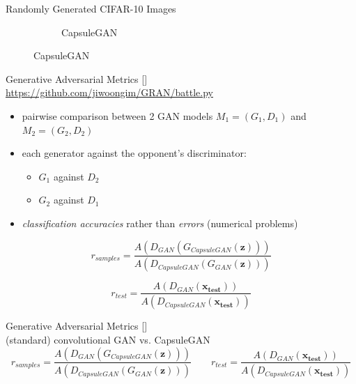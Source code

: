 \documentclass{beamer}
\newcommand{\gamCitation}{[\cite{Im2016generative}]}
\begin{document}
{\begin{frame}{Randomly Generated CIFAR-10 Images}
\begin{figure}
\begin{subfigure}{.49\textwidth}
          \caption{CapsuleGAN}
          \label{fig:capsgan_cifar10_randomly_generated}
        \end{subfigure}
      \end{figure}
    \end{frame}

    \begin{frame}{Generative Adversarial Metrics \gamCitation\\
        \tiny \url{https://github.com/jiwoongim/GRAN/battle.py}}
      \pause
      \begin{itemize}[<+- | alert@+>]
        \item pairwise comparison between 2 GAN models $M_1 = (G_1, D_1)$ and $M_2 = (G_2, D_2)$ 
        \item each generator against the opponent's discriminator:
          \begin{itemize}[<+- | alert@+>]
            \item $G_1$ against $D_2$
            \item $G_2$ against $D_1$
          \end{itemize}
        \item \emph{classification accuracies} rather than \emph{errors} (numerical problems)
      \end{itemize}
      \pause

      \begin{equation*}
        r_{samples} = \frac{A(D_{GAN}(G_{CapsuleGAN}(\mathbf{z})))}{A(D_{CapsuleGAN}(G_{GAN}(\mathbf{z})))}
      \end{equation*}
      \pause

      \begin{equation*}
        r_{test} = \frac{A(D_{GAN}(\mathbf{x_{test}}))}{A(D_{CapsuleGAN}(\mathbf{x_{test}}))}
      \end{equation*}
    \end{frame}

    \begin{frame}{Generative Adversarial Metrics \gamCitation\\
        \tiny (standard) convolutional GAN vs. CapsuleGAN}
      \pause
      \begin{equation*}
        r_{samples} = \frac{A(D_{GAN}(G_{CapsuleGAN}(\mathbf{z})))}{A(D_{CapsuleGAN}(G_{GAN}(\mathbf{z})))}
        \qquad
        r_{test} = \frac{A(D_{GAN}(\mathbf{x_{test}}))}{A(D_{CapsuleGAN}(\mathbf{x_{test}}))}
      \end{equation*}
      \pause


\end{frame}}
\end{document}
